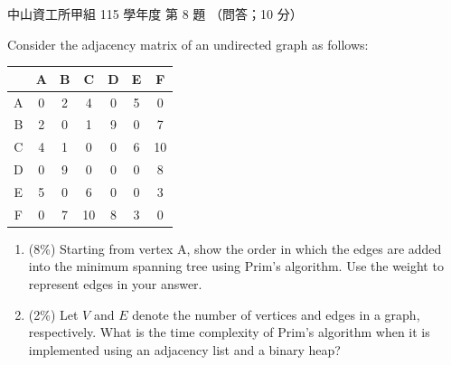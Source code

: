 \begin{pastexam}[label={px:nsysu-115-osds-04}]{中山資工所甲組 115 學年度 第 8 題}
（問答；10 分）

Consider the adjacency matrix of an undirected graph as follows:
\begin{center}
\begin{tabular}{|c|c|c|c|c|c|c|}
\hline
  & A & B & C & D & E & F \\ \hline
A & 0 & 2 & 4 & 0 & 5 & 0 \\ \hline
B & 2 & 0 & 1 & 9 & 0 & 7 \\ \hline
C & 4 & 1 & 0 & 0 & 6 & 10 \\ \hline
D & 0 & 9 & 0 & 0 & 0 & 8 \\ \hline
E & 5 & 0 & 6 & 0 & 0 & 3 \\ \hline
F & 0 & 7 & 10 & 8 & 3 & 0 \\ \hline
\end{tabular}
\end{center}
\begin{enumerate}[label=(\alph*)]
\item (8\%) Starting from vertex A, show the order in which the edges are added into the minimum
spanning tree using Prim's algorithm. Use the weight to represent edges in your answer.
\item (2\%) Let $V$ and $E$ denote the number of vertices and edges in a graph, respectively. What
is the time complexity of Prim's algorithm when it is implemented using an adjacency list and a
binary heap?
\end{enumerate}
\end{pastexam}

